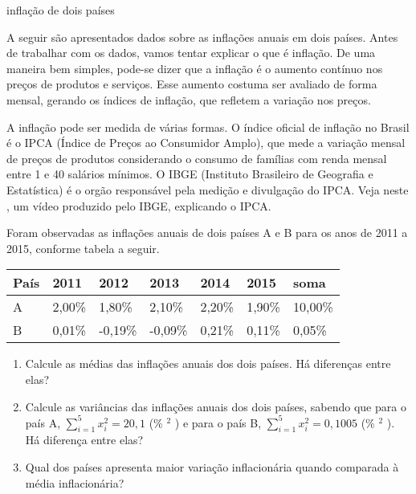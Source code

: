 \begin{task}{inflação de dois países}

A seguir são apresentados dados sobre as inflações anuais em dois países. Antes de trabalhar com os dados, vamos tentar explicar o que é inflação. De uma maneira bem simples, pode-se dizer que a inflação é o aumento contínuo nos preços de produtos e serviços. Esse aumento costuma ser avaliado de forma mensal, gerando os índices de inflação, que refletem a variação nos preços.

A inflação pode ser medida de várias formas. O índice oficial de inflação no Brasil é o IPCA (Índice de Preços ao Consumidor Amplo), que mede a variação mensal de preços de produtos considerando o consumo de famílias com renda mensal entre 1 e 40 salários mínimos. O IBGE (Instituto Brasileiro de Geografia e Estatística) é o orgão responsável pela medição e divulgação do IPCA. Veja neste
, um vídeo produzido pelo IBGE, explicando o IPCA.

Foram observadas as inflações anuais de dois países A e B para os anos de 2011 a 2015, conforme tabela a seguir.


\begin{savenotes}\sphinxattablestart
\centering
{}
\label{\detokenize{PE104-4:id9}}
\sphinxaftercaption
\begin{tabulary}{\linewidth}[t]{|T|T|T|T|T|T|T|}
\hline

País
&
2011
&
2012
&
2013
&
2014
&
2015
&
soma
\\
\hline
A
&
2,00\%
&
1,80\%
&
2,10\%
&
2,20\%
&
1,90\%
&
10,00\%
\\
\hline
B
&
0,01\%
&
-0,19\%
&
-0,09\%
&
0,21\%
&
0,11\%
&
0,05\%
\\
\hline
\end{tabulary}
\par
\sphinxattableend\end{savenotes}
\begin{enumerate}
\item {} 
Calcule as médias das inflações anuais dos dois países. Há diferenças entre elas?

\item {} 
Calcule as variâncias das inflações anuais dos dois países, sabendo que para o país A, \(\displaystyle{\sum^5_{i=1}}x^2_i=20,1\)  (\% \(^2\) ) e para o país B,  \(\displaystyle{\sum^5_{i=1}}x^2_i=0,1005\)  (\% \(^2\) ). Há diferença entre elas?

\item {} 
Qual dos países apresenta maior variação inflacionária quando comparada à média inflacionária?

\end{enumerate}
\end{task}


